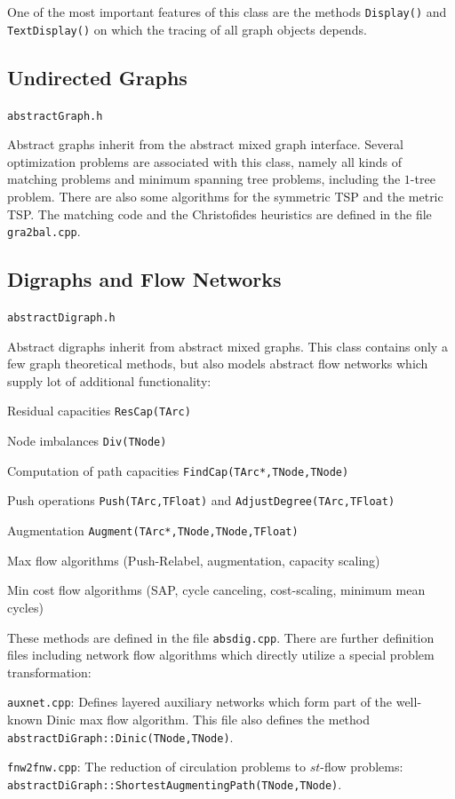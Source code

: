 \documentclass[a4paper,11pt,twoside]{book}
\begin{document}
\begin{multicols}{2}
One of the most important features of this class are the methods
\verb/Display()/ and \verb/TextDisplay()/ on which the tracing of all
graph objects depends.


\subsection{Undirected Graphs}
\myinclude\verb/abstractGraph.h/

\bigskip\noindent
Abstract graphs inherit from the abstract mixed graph interface. Several
optimization problems are associated with this class, namely all kinds of
matching problems and minimum spanning tree problems, including the
$1$-tree problem. There are also some algorithms for the symmetric TSP and the
metric TSP. The matching code and the Christofides heuristics are defined
in the file \verb/gra2bal.cpp/.


\subsection{Digraphs and Flow Networks}
\myinclude\verb/abstractDigraph.h/

\bigskip\noindent
Abstract digraphs inherit from abstract mixed graphs. This class contains only a
few graph theoretical methods, but also models abstract flow networks which
supply lot of additional functionality:
\begin{myitemize}
\item Residual capacities \verb/ResCap(TArc)/
\item Node imbalances \verb/Div(TNode)/
\item Computation of path capacities \verb/FindCap(TArc*,TNode,TNode)/
\item Push operations \verb/Push(TArc,TFloat)/ and
    \verb/AdjustDegree(TArc,TFloat)/
\item Augmentation \verb/Augment(TArc*,TNode,TNode,TFloat)/
\item Max flow algorithms (Push-Relabel, augmentation, capacity scaling)
\item Min cost flow algorithms (SAP, cycle canceling, cost-scaling, minimum
    mean cycles)
\end{myitemize}
These methods are defined in the file \verb/absdig.cpp/. There are further
definition files including network flow algorithms which directly utilize a
special problem transformation:
\begin{myitemize}
\item \verb/auxnet.cpp/: Defines layered auxiliary networks which form part of
the well-known Dinic max flow algorithm. This file also defines the method
\verb/abstractDiGraph::Dinic(TNode,TNode)/.
\item \verb/fnw2fnw.cpp/: The reduction of circulation problems
to $st$-flow problems: \verb/abstractDiGraph::ShortestAugmentingPath(TNode,TNode)/.
\end{myitemize}



\end{multicols}
\end{document}
